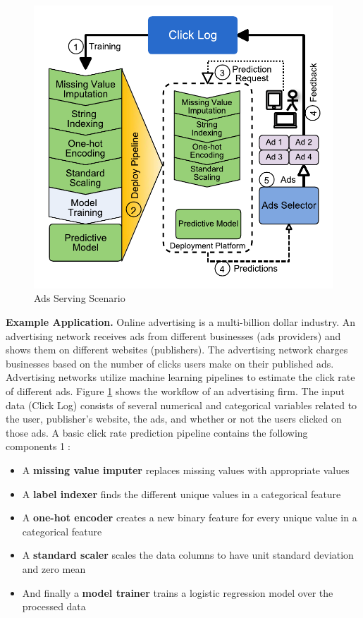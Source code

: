 \begin{figure}[t]
\centering
\includegraphics[width=\columnwidth]{../images/motivational-example-vertical.pdf}
\caption{Ads Serving Scenario}
\label{fig:motivational-example}
\end{figure}
\textbf{Example Application.} 
Online advertising is a multi-billion dollar industry.
An advertising network receives ads from different businesses (ads providers) and shows them on different websites (publishers).
The advertising network charges businesses based on the number of clicks users make on their published ads.
Advertising networks utilize machine learning pipelines to estimate the click rate of different ads.
Figure \ref{fig:motivational-example} shows the workflow of an advertising firm.
The input data (Click Log) consists of several numerical and categorical variables related to the user, publisher's website,  the ads,  and whether or not the users clicked on those ads.
A basic click rate prediction pipeline contains the following components \textcircled{1}:
\begin{itemize}
\item A \textbf{missing value imputer} replaces missing values with appropriate values
\item A \textbf{label indexer} finds the different unique values in a categorical feature 
\item A \textbf{one-hot encoder} creates a new binary feature for every unique value in a categorical feature
\item A \textbf{standard scaler} scales the data columns to have unit standard deviation and zero mean
\item And finally a \textbf{model trainer} trains a logistic regression model over the processed data
\end{itemize}
